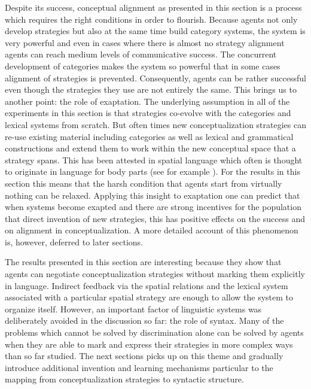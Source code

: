 Despite its success, conceptual alignment as presented in this section is a process
which requires the right conditions in order to flourish. Because agents not only develop 
strategies but also at the same time build category systems, the system is very powerful
and even in cases where there is almost no strategy alignment agents can
reach medium levels of communicative success. The concurrent development of 
categories makes the system so powerful that in some cases alignment of strategies is prevented.
Consequently, agents can be rather successful even though the strategies they use are
not entirely the same. This brings us to another point: the role of exaptation. The underlying assumption
in all of the experiments in this section is that strategies co-evolve with the categories
and lexical systems from scratch. But often times new conceptualization strategies can re-use
existing material including categories as well as lexical and grammatical constructions 
and extend them to work within the new conceptual space that a strategy spans. This has been attested in 
spatial language which often is thought to originate in language for body parts (see 
for example \citealp{maclaury1989zapotec}). For the results in this section this means 
that the harsh condition that agents
start from virtually nothing can be relaxed. 
Applying this insight to exaptation one can predict that when systems become exapted 
and there are strong incentives for the population that direct invention of new strategies,
this has positive effects on the success and on alignment in conceptualization. 
A more detailed account of this phenomenon is, however, deferred to later sections.


The results presented in this section are interesting because they show that
agents can negotiate conceptualization strategies without marking them explicitly in
language. Indirect feedback via the spatial relations and the lexical system associated
with a particular spatial strategy are enough to allow the system to organize itself. 
However, an important factor of linguistic systems was deliberately avoided in the discussion so far:
the role of syntax. Many of the problems which cannot be solved by discrimination alone 
can be solved by agents when they are able to mark and express their strategies in more
complex ways than so far studied. The next sections picks up on this theme and gradually
introduce additional invention and learning mechanisms particular to the mapping from 
conceptualization strategies to syntactic structure.


% 
% 
% 